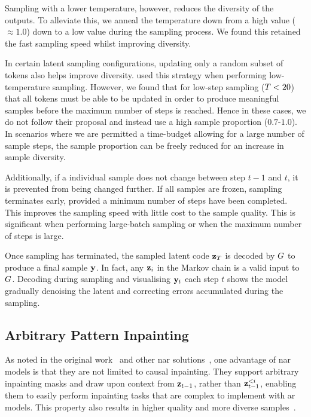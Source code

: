 Sampling with a lower temperature, however, reduces the diversity of the
outputs. To alleviate this, we anneal the temperature down from a high value
($\approx 1.0$) down to a low value during the sampling process. We found this
retained the fast sampling speed whilst improving diversity.

In certain latent sampling configurations, updating only a random subset of
tokens also helps improve diversity. \citet{savinov2022stepunrolled} used this
strategy when performing low-temperature sampling. However, we found that for
low-step sampling ($T<20$) that all tokens must be able to be updated
in order to produce meaningful samples before the maximum number of steps is
reached. Hence in these cases, we do not follow their proposal and instead use a
high sample proportion ($0.7$-$1.0$). In scenarios where we are permitted a
time-budget allowing for a large number of sample steps, the sample proportion
can be freely reduced for an increase in sample diversity.

Additionally, if a individual sample does not change between step $t-1$ and $t$,
it is prevented from being changed further. If all samples are frozen, sampling
terminates early, provided a minimum number of steps have been completed. This
improves the sampling speed with little cost to the sample quality. This
is significant when performing large-batch sampling or when the maximum number
of steps is large.

Once sampling has terminated, the sampled latent code $\mathbf{z}_T$ is
decoded by $G$ to produce a final sample $\mathbf{y}$. In fact, any
$\mathbf{z}_i$ in the Markov chain is a valid input to $G$. Decoding
during sampling and visualising $\mathbf{y}_t$ each step $t$ shows the model
gradually denoising the latent and correcting errors accumulated during the
sampling.

\subsection{Arbitrary Pattern Inpainting}
\label{subsec:inpainting}

As noted in the original work~\cite{savinov2022stepunrolled} and other \gls{nar}
solutions~\cite{bondtaylor2021unleashing}, one advantage of \gls{nar} models is
that they are not limited to causal inpainting. They support arbitrary
inpainting masks and draw upon context from $\mathbf{z}_{t-1}$, rather than
$\mathbf{z}_{t-1}^{<i}$, enabling them to easily perform inpainting tasks that are
complex to implement with \gls{ar} models. This property also results in 
higher quality and more diverse samples~\cite{bondtaylor2021unleashing}.

